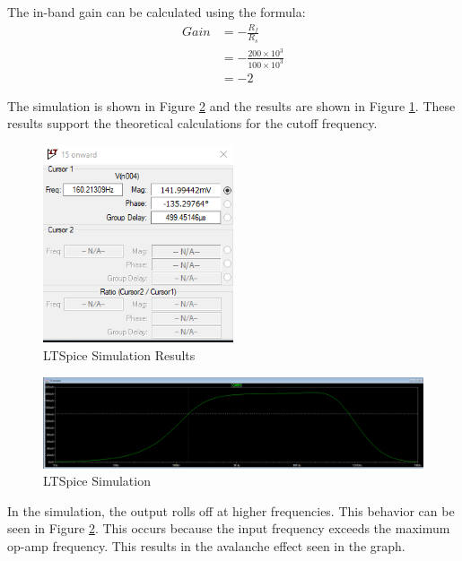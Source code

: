 \documentclass[12pt]{article}
\begin{document}
The in-band gain can be calculated using the formula:
\[
  \begin{aligned}
	Gain & = -\frac{R_f}{R_s} \\
	& = -\frac{200 \times 10^3}{100 \times 10^3} \\
	& = -2
  \end{aligned}
\]

The simulation is shown in Figure \ref{fig:1.5Simulation} and
the results are shown in Figure \ref{fig:1.5Results}. These results
support the theoretical calculations for the cutoff frequency.
\begin{figure}[H]
  \centering
  \includegraphics[width=0.5\textwidth]{Lab 10 Shared/1.5 simulation results.PNG}
  \caption{LTSpice Simulation Results}
  \label{fig:1.5Results}
\end{figure}

\begin{figure}[H]
  \centering
  \includegraphics[width=1\textwidth]{Lab 10 Shared/1.5 simulation.PNG}
  \caption{LTSpice Simulation}
  \label{fig:1.5Simulation}
\end{figure}

In the simulation, the output rolls off at higher frequencies. This behavior 
can be seen in Figure \ref{fig:1.5Simulation}. This occurs because the input
frequency exceeds the maximum op-amp frequency. This results in the avalanche
effect seen in the graph.
\end{document}
